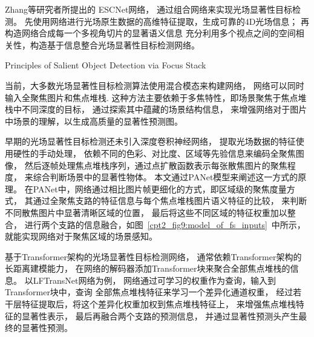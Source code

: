 





Zhang等研究者所提出的 ESCNet网络，
通过组合网络来实现光场显著性目标检测。
先使用网络进行光场原生数据的高维特征提取，生成可靠的4D光场信息；
再构造网络合成每一个多视角切片的显著语义信息
充分利用多个视点之间的空间相关性，构造基于信息整合光场显著性目标检测网络。









{Principles of Salient Object Detection via Focus Stack}

  
当前，大多数光场显著性目标检测算法使用混合模态来构建网络，
网络可以同时输入全聚焦图片和焦点堆栈.
这种方法主要依赖于多焦特性，即场景聚焦于焦点堆栈中不同深度的目标，
通过探索其中蕴藏的场景结构信息，
来增强网络对于图片中场景的理解，以生成高质量的显著性预测图。





早期的光场显著性目标检测还未引入深度卷积神经网络，
提取光场数据的特征使用硬性的手动处理，
依赖不同的色彩、对比度、区域等先验信息来编码全聚焦图像，
然后逐帧处理焦点堆栈序列，通过点扩散函数表示每张散焦图片的聚焦程度，
来综合判断场景中的显著性物体。
本文通过PANet模型来阐述这一方式的原理。
在PANet中，网络通过相比图片帧更细化的方式，即区域级的聚焦度量方式，
其通过全聚焦支路的特征信息与每个焦点堆栈图片语义特征的比较，
来判断不同散焦图片中显著清晰区域的位置，
最后将这些不同区域的特征权重加以整合，
进行两个支路的信息融合，如图~\ref{cpt2_fig9:model_of_fs_inputs}~中所示，
就能实现网络对于聚焦区域的场景感知。






基于Transformer架构的光场显著性目标检测网络，
通常依赖Transformer架构的长距离建模能力，
在网络的解码器添加Transformer块来聚合全部焦点堆栈的信息。
以LFTransNet网络为例，
网络通过可学习的权重作为查询，输入到Transformer块中，查询
全部焦点堆栈特征来学习一个差异化通道权重，
经过若干层特征提取后，将这个差异化权重加权到焦点堆栈特征上，
来增强焦点堆栈特征的显著性表示，
最后再融合两个支路的预测信息，
并通过显著性预测头产生最终的显著性预测。



